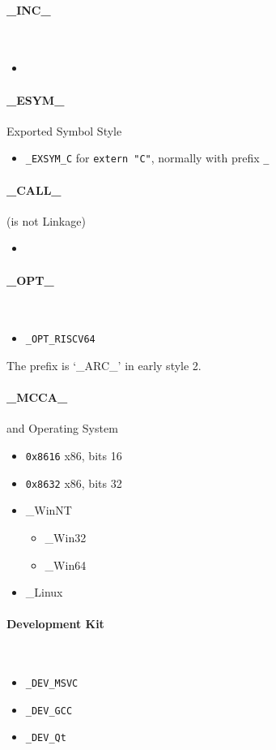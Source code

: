 \paragraph{\_INC\_} \
\begin{itemize}
	\item%
\end{itemize}

\paragraph{\_ESYM\_} Exported Symbol Style \
\begin{itemize}
	\item \verb`_EXSYM_C` for \verb`extern "C"`, normally with prefix \verb`_`
\end{itemize}

\paragraph{\_CALL\_} (is not Linkage) \
\begin{itemize}
	\item%
\end{itemize}

\paragraph{\_OPT\_} \
\begin{itemize}
	\item \verb`_OPT_RISCV64`
\end{itemize}

The prefix is `\_ARC\_' in early style 2.

\paragraph{\_MCCA\_} and Operating System

\begin{itemize}
	\item \verb|0x8616| x86, bits 16
	\item \verb|0x8632| x86, bits 32
	\item \_WinNT \begin{itemize}
		\item \_Win32
		\item \_Win64
	\end{itemize}
	\item \_Linux
\end{itemize}

\paragraph{Development Kit} \
\begin{itemize}
\item \verb `_DEV_MSVC`
\item \verb `_DEV_GCC`
\item \verb `_DEV_Qt` 
\end{itemize}
